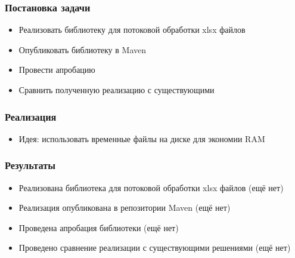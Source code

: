 \documentclass{beamer}
\begin{document}
\begin{frame}\frametitle{Постановка задачи}
\begin{itemize}
    \item Реализовать библиотеку для потоковой обработки xlsx файлов
    \item Опубликовать библиотеку в Maven
    \item Провести апробацию
    \item Сравнить полученную реализацию с существующими
\end{itemize}
\end{frame}

\begin{frame}\frametitle{Реализация}
\begin{itemize}
    \item Идея: использовать временные файлы на диске для экономии RAM
\end{itemize}
\end{frame}

\begin{frame}\frametitle{Результаты}
\begin{itemize}
    \item Реализована библиотека для потоковой обработки xlsx файлов (ещё нет)
    \item Реализация опубликована в репозитории Maven (ещё нет)
    \item Проведена апробация библиотеки (ещё нет)
    \item Проведено сравнение реализации с существующими решениями (ещё нет)
\end{itemize}
\end{frame}


\end{document}
